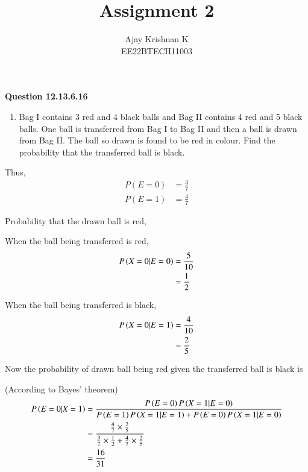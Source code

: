 \documentclass[journal,11pt,onecolumn]{IEEEtran}
\begin{document}
\vspace{3cm}
\author{Ajay Krishnan K\\EE22BTECH11003}

\title{Assignment 2}
\maketitle

\textbf{Question 12.13.6.16}
\begin{enumerate}
    \item Bag I contains 3 red and 4 black balls and Bag II contains 4 red and 5 black balls.
          One ball is transferred from Bag I to Bag II and then a ball is drawn from Bag II.
          The ball so drawn is found to be red in colour. Find the probability that the
          transferred ball is black.
\end{enumerate}

\solution


Thus,
\begin{align}
    P(E=0) & = \frac{3}{7} \\
    P(E=1) & = \frac{4}{7}
\end{align}

Probability that the drawn ball is red,

When the ball being transferred is red,
\begin{align}
    P\left(X=0\middle|E=0\right) & = \frac{5}{10} \\
                            & =\frac{1}{2}
\end{align}

When the ball being transferred is black,
\begin{align}
    P\left(X=0\middle|E=1\right) & = \frac{4}{10} \\
                            & =\frac{2}{5}
\end{align}

Now the probability of drawn ball being red given the transferred ball
is black is

(According to Bayes' theorem)
\begin{align}
    P\left(E=0\middle|X=1\right)
     & = \frac{P\left(E=0\right)P\left(X=1\middle|E=0\right)}{P\left(E=1\right)P\left(X=1\middle|E=1\right) + P\left(E=0\right)P\left(X=1\middle|E=0\right)} \\
     & = \frac{\frac{4}{7} \times \frac{2}{5}}{\frac{3}{7}\times\frac{1}{2}+\frac{4}{7}\times\frac{2}{5}}                   \\
     & = \frac{16}{31}
\end{align}
\end{document}
